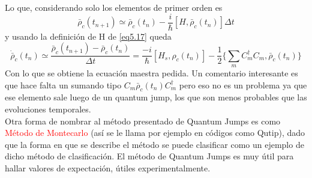 \documentclass{book}
\begin{document}
Lo que, considerando solo los elementos de primer orden es
\begin{equation}\label{eq5.17}\bar{\rho}_c(t_{n+1})\simeq \bar{\rho}_c(t_n)-\frac{i}{\hslash}[H,\bar{\rho}_c(t_n)]\Delta t\end{equation}
y usando la definición de H de \ref{eq5.17} queda
\begin{equation}\label{eq5.18}\dot{\bar{\rho}}_c(t_n) \simeq\frac{\bar{\rho}_c(t_{n+1})-\bar{\rho}_c(t_n)}{\Delta t}=\frac{-i}{\hslash}[H_s,\rho_c(t_n)]-\frac{1}{2}\{\sum_m C_m^\dag C_m,\bar{\rho}_c(t_n)\}\end{equation}
Con lo que se obtiene la ecuación maestra pedida. Un comentario interesante es que hace falta un sumando tipo $C_m\bar{\rho}_c(t_n)C_m^\dag$ pero eso no es un problema ya que ese elemento sale luego de un quantum jump, los que son menos probables que las evoluciones temporales.\\

Otra forma de nombrar al método presentado de Quantum Jumps es como \textcolor{red}{Método de Montecarlo} (así se le llama por ejemplo en códigos como Qutip), dado que la forma en que se describe el método se puede clasificar como un ejemplo de dicho método de clasificación. El método de Quantum Jumps es muy útil para hallar valores de expectación, útiles experimentalmente.
\end{document}
